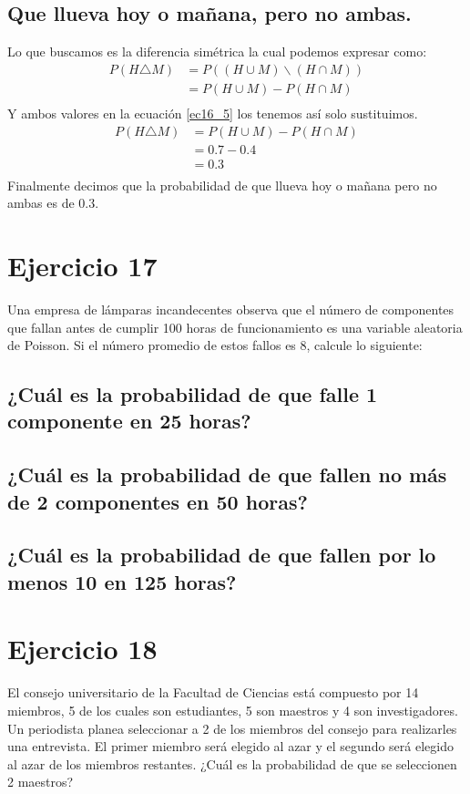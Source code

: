 \documentclass[12pt]{article}
\begin{document}
\subsection{Que llueva hoy o mañana, pero no ambas.}
Lo que buscamos es la diferencia simétrica la cual podemos expresar como:
\begin{equation}\label{ec16_5}
\begin{split}
P(H\triangle M) &= P((H\cup M) \backslash (H\cap M))\\
&= P(H\cup M) - P(H\cap M)\\
\end{split}
\end{equation}
Y ambos valores en la ecuación \ref{ec16_5} los tenemos así solo sustituimos.
\begin{equation}\label{ec16_6}
\begin{split}
P(H\triangle M) &= P(H\cup M) - P(H\cap M)\\
&= 0.7 - 0.4\\
&= 0.3\\
\end{split}
\end{equation}
Finalmente decimos que la probabilidad de que llueva hoy o mañana pero no ambas es de $0.3$. 
\section{Ejercicio 17}
Una empresa de lámparas incandecentes observa que el número de componentes que fallan
antes de cumplir 100 horas de funcionamiento es una variable aleatoria de Poisson. Si el
número promedio de estos fallos es 8, calcule lo siguiente:
\subsection{¿Cuál es la probabilidad de que falle 1 componente en 25 horas?}
\subsection{¿Cuál es la probabilidad de que fallen no más de 2 componentes en 50 horas?}
\subsection{¿Cuál es la probabilidad de que fallen por lo menos 10 en 125 horas?}
\section{Ejercicio 18}
 El consejo universitario de la Facultad de Ciencias está compuesto por 14 miembros, 5 de los
cuales son estudiantes, 5 son maestros y 4 son investigadores. Un periodista planea seleccionar
a 2 de los miembros del consejo para realizarles una entrevista. El primer miembro será elegido
al azar y el segundo será elegido al azar de los miembros restantes. ¿Cuál es la probabilidad
de que se seleccionen 2 maestros?
\end{document}
